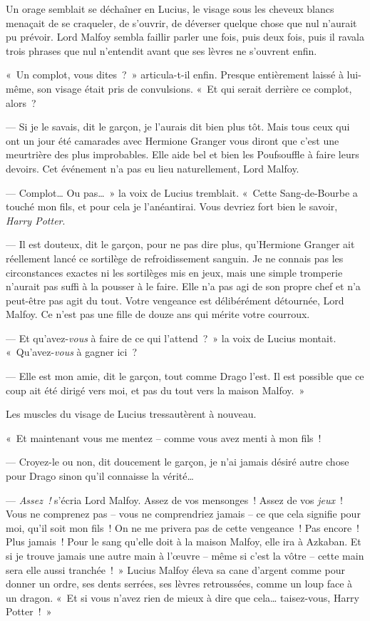 Un orage semblait se déchaîner en Lucius, le visage sous les cheveux blancs menaçait de se craqueler, de s'ouvrir, de déverser quelque chose que nul n'aurait pu prévoir.
Lord Malfoy sembla faillir parler une fois, puis deux fois, puis il ravala trois phrases que nul n'entendit avant que ses lèvres ne s'ouvrent enfin.

«~Un complot, vous dites~?~»
articula-t-il enfin.
Presque entièrement laissé à lui-même, son visage était pris de convulsions.
«~Et qui serait derrière ce complot, alors~?

--- Si je le savais, dit le garçon, je l'aurais dit bien plus tôt.
Mais tous ceux qui ont un jour été camarades avec Hermione Granger vous diront que c'est une meurtrière des plus improbables.
Elle aide bel et bien les Poufsouffle à faire leurs devoirs.
Cet événement n'a pas eu lieu naturellement, Lord Malfoy.

--- Complot…
Ou pas…~» la voix de Lucius tremblait.
«~Cette Sang-de-Bourbe a touché mon fils, et pour cela je l'anéantirai.
Vous devriez fort bien le savoir, \emph{Harry Potter}.

--- Il est douteux, dit le garçon, pour ne pas dire plus, qu'Hermione Granger ait réellement lancé ce sortilège de refroidissement sanguin.
Je ne connais pas les circonstances exactes ni les sortilèges mis en jeux, mais une simple tromperie n'aurait pas suffi à la pousser à le faire.
Elle n'a pas agi de son propre chef et n'a peut-être pas agit du tout.
Votre vengeance est délibérément détournée, Lord Malfoy.
Ce n'est pas une fille de douze ans qui mérite votre courroux.

--- Et qu'avez-\emph{vous} à faire de ce qui l'attend~?~»
la voix de Lucius montait.
«~Qu'avez-\emph{vous} à gagner ici~?

--- Elle est mon amie, dit le garçon, tout comme Drago l'est.
Il est possible que ce coup ait été dirigé vers moi, et pas du tout vers la maison Malfoy.~»

Les muscles du visage de Lucius tressautèrent à nouveau.

«~Et maintenant vous me mentez -- comme vous avez menti à mon fils~!

--- Croyez-le ou non, dit doucement le garçon, je n'ai jamais désiré autre chose pour Drago sinon qu'il connaisse la vérité…

--- \emph{Assez~!} s'écria Lord Malfoy.
Assez de vos mensonges~!
Assez de vos \emph{jeux}~!
Vous ne comprenez pas -- vous ne comprendriez jamais -- ce que cela signifie pour moi, qu'il soit mon fils~!
On ne me privera pas de cette vengeance~!
Pas encore~!
Plus jamais~!
Pour le sang qu'elle doit à la maison Malfoy, elle ira à Azkaban.
Et si je trouve jamais une autre main à l'œuvre -- même si c'est la vôtre -- cette main sera elle aussi tranchée~!~»
Lucius Malfoy éleva sa cane d'argent comme pour donner un ordre, ses dents serrées, ses lèvres retroussées, comme un loup face à un dragon.
«~Et si vous n'avez rien de mieux à dire que cela… taisez-vous, Harry Potter~!~»

